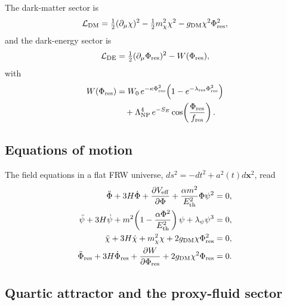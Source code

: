 \documentclass[epj]{svjour}
\begin{document}
The dark-matter sector is
\begin{equation}
\mathcal{L}_{\rm DM}
=\tfrac{1}{2}(\partial_\mu\chi)^2
-\tfrac{1}{2}m_\chi^2\chi^2
-g_{\rm DM}\chi^2\Phi_{\rm res}^2,
\end{equation}
and the dark-energy sector is
\begin{equation}
\mathcal{L}_{\rm DE}
=\tfrac{1}{2}(\partial_\mu\Phi_{\rm res})^2
-W(\Phi_{\rm res}),
\end{equation}
with
\begin{equation}
\begin{split}
W(\Phi_{\rm res})
&=W_0\,e^{-\kappa\Phi_{\rm res}^2}
\!\left(1-e^{-\lambda_{\rm res}\Phi_{\rm res}^2}\right) \\
&\quad +\Lambda_{\rm NP}^4\,e^{-S_E}
\cos\!\left(\frac{\Phi_{\rm res}}{f_{\rm res}}\right).
\end{split}
\label{eq:wpot}
\end{equation}

\subsection{Equations of motion}

The field equations in a flat FRW universe,
\(ds^2=-dt^2+a^2(t)d\mathbf{x}^2\), read
\begin{align}
\ddot\Phi+3H\dot\Phi
+\frac{\partial V_{\rm eff}}{\partial\Phi}
+\frac{\alpha m^2}{E_{\rm th}^2}\Phi\psi^2
&=0,
\label{eq:frw1}
\\
\ddot\psi+3H\dot\psi
+m^2\!\left(1-\frac{\alpha\Phi^2}{E_{\rm th}^2}\right)\psi
+\lambda_\psi\psi^3
&=0,
\label{eq:frw2}
\\
\ddot\chi+3H\dot\chi+m_\chi^2\chi
+2g_{\rm DM}\chi\Phi_{\rm res}^2
&=0,
\label{eq:frw3}
\\
\ddot\Phi_{\rm res}+3H\dot\Phi_{\rm res}
+\frac{\partial W}{\partial\Phi_{\rm res}}
+2g_{\rm DM}\chi^2\Phi_{\rm res}
&=0.
\label{eq:frw4}
\end{align}

\subsection{Quartic attractor and the proxy-fluid sector}
\end{document}
